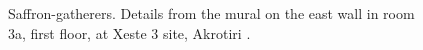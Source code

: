 \begin{figure}[!hbt]
    \centering
    \hfill
    \caption{Saffron-gatherers. Details from the mural on the east wall in room 3a, first floor, at Xeste 3 site, Akrotiri \autocite[152]{doumas_wall-paintings_1992}.}
    \label{fig:saffron_gatherers}
\end{figure}














